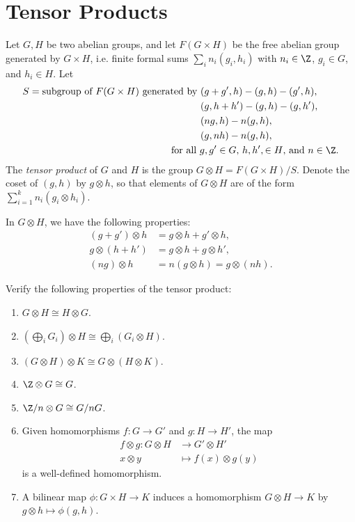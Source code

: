 \section{Tensor Products}
\begin{definition}
  Let $G, H$ be two abelian groups, and let
  $F(G \times H)$ be the free abelian group
  generated by $G \times H$, i.e.
  finite formal sums $\sum_i n_i (g_i, h_i)$
  with $n_i \in \Z$, $g_i \in G$, and $h_i \in H$.
  Let
  \begin{align*}
  S = \text{subgroup of $F(G \times H)$ generated by }
  &(g + g', h) - (g, h) - (g', h), \\
  &(g, h + h') - (g, h) - (g, h'), \\
  &(ng, h) - n(g, h), \\
  &(g, nh) - n(g, h), \\
  &\hspace{-3em} \text{for all $g, g' \in G$, $h, h', \in H$, and $n \in \Z$}.
  \end{align*}
  The \emph{tensor product} of $G$ and $H$ is
  the group $G \otimes H = F(G \times H) / S$.
  Denote the coset of $(g, h)$ by $g \otimes h$,
  so that elements of $G \otimes H$
  are of the form $\sum_{i = 1}^k n_i (g_i \otimes h_i)$.
\end{definition}

\begin{remark}
  In $G \otimes H$, we have the following
  properties:
  \begin{align*}
    (g + g') \otimes h &= g \otimes h + g' \otimes h, \\
    g \otimes (h + h') &= g \otimes h + g \otimes h', \\
    (ng) \otimes h &= n(g \otimes h) = g \otimes (nh).
  \end{align*}
\end{remark}

\begin{exercise}
  Verify the following properties of
  the tensor product:
  \begin{enumerate}
    \item $G \otimes H \cong H \otimes G$.
    \item $(\bigoplus_i G_i) \otimes H \cong \bigoplus_i (G_i \otimes H)$.
    \item $(G \otimes H) \otimes K \cong G \otimes (H \otimes K)$.
    \item $\Z \otimes G \cong G$.
    \item $\Z / n \otimes G \cong G / nG$.
    \item Given homomorphisms
      $f : G \to G'$ and $g : H \to H'$, the map
      \begin{align*}
        f \otimes g : G \otimes H
        &\longrightarrow G' \otimes H' \\
        x \otimes y
        &\longmapsto f(x) \otimes g(y)
      \end{align*}
      is a well-defined homomorphism.
    \item A bilinear map $\phi : G \times H \to K$
      induces a homomorphism
      $G \otimes H \to K$ by $g \otimes h \mapsto \phi(g, h)$.
  \end{enumerate}
\end{exercise}

